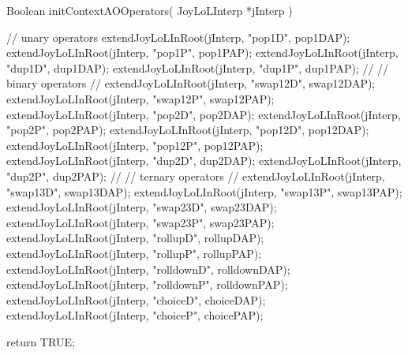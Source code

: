\startCCode
Boolean initContextAOOperators(
  JoyLoLInterp *jInterp
) {
  // unary operators
  extendJoyLoLInRoot(jInterp, "pop1D", pop1DAP);
  extendJoyLoLInRoot(jInterp, "pop1P", pop1PAP);
  extendJoyLoLInRoot(jInterp, "dup1D", dup1DAP);
  extendJoyLoLInRoot(jInterp, "dup1P", dup1PAP);
  //
  // binary operators
  //
  extendJoyLoLInRoot(jInterp, "swap12D", swap12DAP);
  extendJoyLoLInRoot(jInterp, "swap12P", swap12PAP);
  extendJoyLoLInRoot(jInterp, "pop2D",   pop2DAP);
  extendJoyLoLInRoot(jInterp, "pop2P",   pop2PAP);
  extendJoyLoLInRoot(jInterp, "pop12D",  pop12DAP);
  extendJoyLoLInRoot(jInterp, "pop12P",  pop12PAP);
  extendJoyLoLInRoot(jInterp, "dup2D",   dup2DAP);
  extendJoyLoLInRoot(jInterp, "dup2P",   dup2PAP);
  //
  // ternary operators
  //
  extendJoyLoLInRoot(jInterp, "swap13D",   swap13DAP);
  extendJoyLoLInRoot(jInterp, "swap13P",   swap13PAP);
  extendJoyLoLInRoot(jInterp, "swap23D",   swap23DAP);
  extendJoyLoLInRoot(jInterp, "swap23P",   swap23PAP);
  extendJoyLoLInRoot(jInterp, "rollupD",   rollupDAP);
  extendJoyLoLInRoot(jInterp, "rollupP",   rollupPAP);
  extendJoyLoLInRoot(jInterp, "rolldownD", rolldownDAP);
  extendJoyLoLInRoot(jInterp, "rolldownP", rolldownPAP);
  extendJoyLoLInRoot(jInterp, "choiceD",   choiceDAP);
  extendJoyLoLInRoot(jInterp, "choiceP",   choicePAP);
  
  return TRUE;
}
\stopCCode
